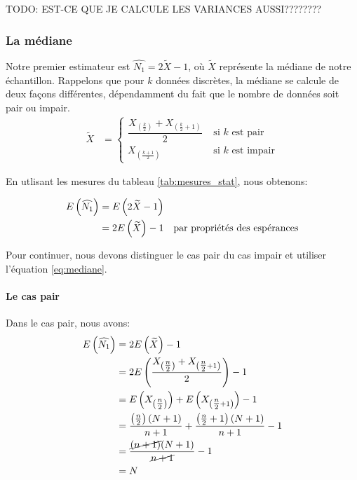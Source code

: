 \documentclass[10pt]{article}
\begin{document}
TODO: EST-CE QUE JE CALCULE LES VARIANCES AUSSI????????

\hypertarget{la-mediane}{%
\subsubsection{La médiane}\label{la-mediane}}

Notre premier estimateur est \(\widehat{N_1}=2\widetilde{X}-1\), où
\(\widetilde{X}\) représente la médiane de notre échantillon. Rappelons
que pour \(k\) données discrètes, la médiane se calcule de deux façons
différentes, dépendamment du fait que le nombre de données soit pair ou
impair. \begin{align}
\widetilde{X} &= 
\begin{cases}
\dfrac{X_{\left(\tfrac{k}{2}\right)}+X_{\left(\tfrac{k}{2}+1\right)}}{2} & \text{ si $k$ est pair} \\
X_{\left(\tfrac{k+1}{2}\right)} & \text{ si $k$ est impair}
\end{cases}
\label{eq:mediane}
\end{align}

En utlisant les mesures du tableau \ref{tab:mesures_stat}, nous
obtenons:

\begin{align*}
E\left(\widehat{N_1}\right) &= E\left(2\widetilde{X}-1\right) \\
&= 2E\left(\widetilde{X}\right)-1 \quad \text{par propriétés des espérances}
\end{align*}

Pour continuer, nous devons distinguer le cas pair du cas impair et
utiliser l'équation \ref{eq:mediane}.

\hypertarget{le-cas-pair}{%
\paragraph{Le cas pair}\label{le-cas-pair}}

Dans le cas pair, nous avons: \begin{align*}
E\left(\widehat{N_1}\right) &= 2E\left(\widetilde{X}\right)-1 \\
&= 2E\left(\dfrac{X_{\left(\tfrac{n}{2}\right)}+X_{\left(\tfrac{n}{2}+1\right)}}{2}\right)-1 \\
&= E\left(X_{\left(\tfrac{n}{2}\right)}\right)+E\left(X_{\left(\tfrac{n}{2}+1\right)}\right)-1 \\
&= \dfrac{\left(\tfrac{n}{2}\right)(N+1)}{n+1}+\dfrac{\left(\tfrac{n}{2}+1\right)(N+1)}{n+1}-1 \\
&= \dfrac{\cancel{(n+1)}(N+1)}{\cancel{n+1}}-1 \\
&= N
\end{align*}
\end{document}
